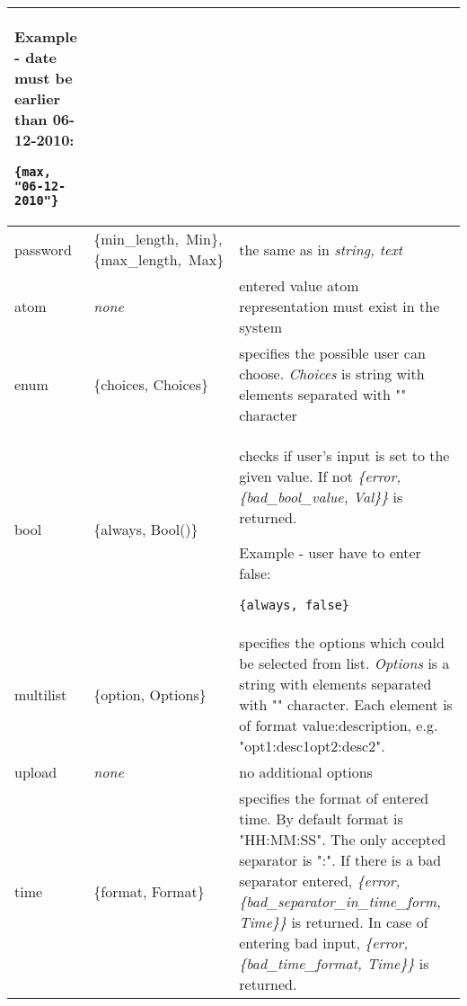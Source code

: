 \begin{longtable}{|p{}|p{}|p{}|}
Example - date must be earlier than 06-12-2010:
\begin{verbatim}
{max, "06-12-2010"}
\end{verbatim}\\
\hline
password & \{min\_length,~Min\}, \{max\_length,~Max\} & the same as in {\it string, text}\\
\hline
atom & {\it none} & entered value atom representation must exist in the system\\
\hline
enum & \{choices, Choices\} & specifies the possible user can choose. {\it Choices} is string with elements separated with "\vline" character\\
\hline
bool & \{always, Bool()\} & checks if user's input is set to the given value. If not {\it \{error, \{bad\_bool\_value, Val\}\}} is returned.

Example - user have to enter false:
\begin{verbatim}
{always, false}
\end{verbatim}\\
\hline
multilist & \{option, Options\} & specifies the options which could be selected from list. {\it Options} is a string with elements separated with "\vline" character. Each element is of format value:description, e.g. "opt1:desc1\vline opt2:desc2".\\
\hline
upload & {\it none} & no additional options\\
\hline
time & \{format, Format\} & specifies the format of entered time. By default format is "HH:MM:SS". The only accepted separator is ":". If there is a bad separator entered, {\it \{error, \{bad\_separator\_in\_time\_form, Time\}\}} is returned. In case of entering bad input, {\it \{error, \{bad\_time\_format, Time\}\}} is returned.


\end{longtable}
